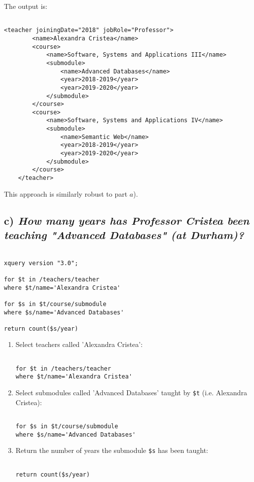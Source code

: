 \documentclass[11pt]{article} %
\begin{document}
The output is:

\begin{verbatim}

<teacher joiningDate="2018" jobRole="Professor">
        <name>Alexandra Cristea</name>
        <course>
            <name>Software, Systems and Applications III</name>
            <submodule>
                <name>Advanced Databases</name>
                <year>2018-2019</year>
                <year>2019-2020</year>
            </submodule>
        </course>
        <course>
            <name>Software, Systems and Applications IV</name>
            <submodule>
                <name>Semantic Web</name>
                <year>2018-2019</year>
                <year>2019-2020</year>
            </submodule>
        </course>
    </teacher>

\end{verbatim}

This approach is similarly robust to part $a$). 

\clearpage
\subsection*{c) \textit{How many years has Professor Cristea been teaching "Advanced Databases" (at Durham)?}}

\begin{verbatim}

xquery version "3.0";

for $t in /teachers/teacher
where $t/name='Alexandra Cristea'

for $s in $t/course/submodule
where $s/name='Advanced Databases'

return count($s/year)

\end{verbatim}

\begin{enumerate}

\item{Select teachers called 'Alexandra Cristea':}

\begin{verbatim}

for $t in /teachers/teacher
where $t/name='Alexandra Cristea'

\end{verbatim}

\item{Select submodules called 'Advanced Databases' taught by \verb|$t| (i.e. Alexandra Cristea):}

\begin{verbatim}

for $s in $t/course/submodule
where $s/name='Advanced Databases'

\end{verbatim}

\item{Return the number of years the submodule \verb|$s| has been taught}:

\begin{verbatim}

return count($s/year)

\end{verbatim}

\end{enumerate}
\end{document}

